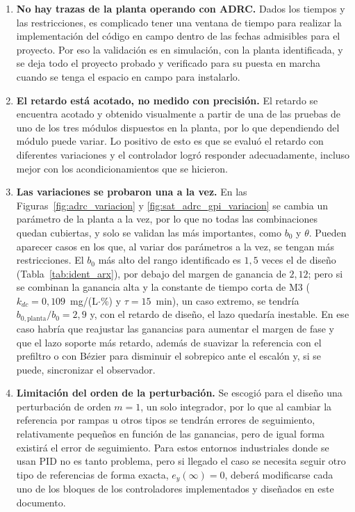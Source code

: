 \begin{enumerate}
  \item \textbf{No hay trazas de la planta operando con ADRC.} Dados los tiempos y las restricciones,
  es complicado tener una ventana de tiempo para realizar la implementación del código en campo dentro
  de las fechas admisibles para el proyecto. Por eso la validación es en simulación, con la planta
  identificada, y se deja todo el proyecto probado y verificado para su puesta en marcha cuando se tenga
  el espacio en campo para instalarlo. 


  \item \textbf{El retardo está acotado, no medido con precisión.} El retardo se encuentra acotado y
  obtenido visualmente a partir de una de las pruebas de uno de los tres módulos dispuestos en la
  planta, por lo que dependiendo del módulo puede variar. Lo positivo de esto es que se evaluó el
  retardo con diferentes variaciones y el controlador logró responder adecuadamente, incluso mejor con
  los acondicionamientos que se hicieron.

  \item \textbf{Las variaciones se probaron una a la vez.} En las
  Figuras~\ref{fig:adrc_variacion} y \ref{fig:sat_adrc_gpi_variacion} se cambia un parámetro de la
  planta a la vez, por lo que no todas las combinaciones quedan cubiertas, y solo se validan las
  más importantes, como $b_0$ y $\theta$. Pueden aparecer casos en los que, al variar dos
  parámetros a la vez, se tengan más restricciones. El $b_0$ más alto del rango identificado es
  $1{,}5$ veces el de diseño (Tabla~\ref{tab:ident_arx}), por debajo del margen de ganancia de
  $2{,}12$; pero si se combinan la ganancia alta y la constante de tiempo corta de M3
  ($k_{dc} = 0{,}109$~mg/(L$\cdot$\%) y $\tau = 15$~min), un caso extremo, se tendría
  $b_{0,\mathrm{planta}}/b_0 = 2{,}9$ y, con el retardo de diseño, el lazo quedaría
  inestable. En ese caso habría que reajustar las ganancias para aumentar el margen de fase y que el
  lazo soporte más retardo, además de suavizar la referencia con el prefiltro o con Bézier para
  disminuir el sobrepico ante el escalón y, si se puede, sincronizar el observador.

  \item \textbf{Limitación del orden de la perturbación.} Se escogió para el diseño una perturbación de
  orden $m = 1$, un solo integrador, por lo que al cambiar la referencia por rampas u otros tipos se
  tendrán errores de seguimiento, relativamente pequeños en función de las ganancias, pero de igual forma existirá el error de seguimiento. Para estos entornos industriales
  donde se usan PID no es tanto problema, pero si llegado el caso se necesita seguir otro tipo de
  referencias de forma exacta, $e_y(\infty) = 0$, deberá modificarse cada uno de los bloques de los
  controladores implementados y diseñados en este documento.
\end{enumerate}

